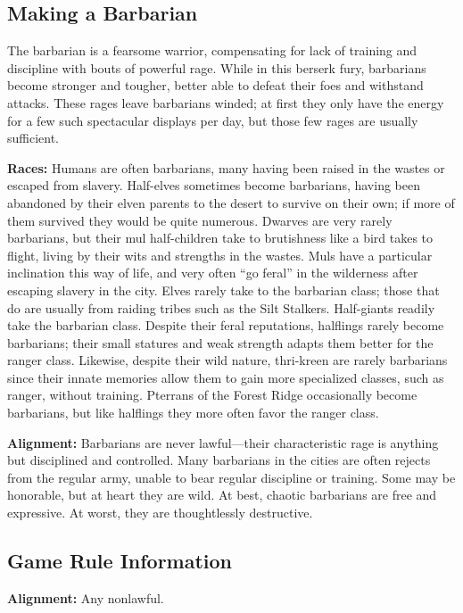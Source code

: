 
\subsection{Making a Barbarian}

The barbarian is a fearsome warrior, compensating for lack of training and discipline with bouts of powerful rage. While in this berserk fury, barbarians become stronger and tougher, better able to defeat their foes and withstand attacks. These rages leave barbarians winded; at first they only have the energy for a few such spectacular displays per day, but those few rages are usually sufficient.

\textbf{Races:} Humans are often barbarians, many having been raised in the wastes or escaped from slavery. Half-elves sometimes become barbarians, having been abandoned by their elven parents to the desert to survive on their own; if more of them survived they would be quite numerous. Dwarves are very rarely barbarians, but their mul half-children take to brutishness like a bird takes to flight, living by their wits and strengths in the wastes. Muls have a particular inclination this way of life, and very often ``go feral'' in the wilderness after escaping slavery in the city. Elves rarely take to the barbarian class; those that do are usually from raiding tribes such as the Silt Stalkers. Half-giants readily take the barbarian class. Despite their feral reputations, halflings rarely become barbarians; their small statures and weak strength adapts them better for the ranger class. Likewise, despite their wild nature, thri-kreen are rarely barbarians since their innate memories allow them to gain more specialized classes, such as ranger, without training. Pterrans of the Forest Ridge occasionally become barbarians, but like halflings they more often favor the ranger class.

\textbf{Alignment:} Barbarians are never lawful---their characteristic rage is anything but disciplined and controlled. Many barbarians in the cities are often rejects from the regular army, unable to bear regular discipline or training. Some may be honorable, but at heart they are wild. At best, chaotic barbarians are free and expressive. At worst, they are thoughtlessly destructive.

\subsection{Game Rule Information}
\textbf{Alignment:} Any nonlawful.

